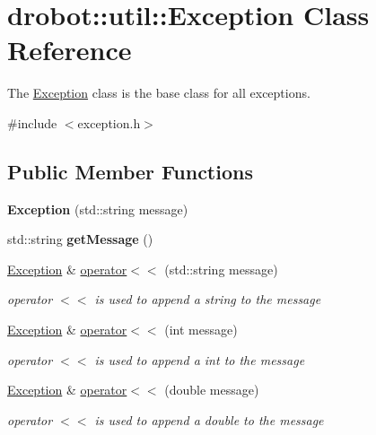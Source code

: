 \hypertarget{classdrobot_1_1util_1_1Exception}{\section{drobot\-:\-:util\-:\-:Exception Class Reference}
\label{classdrobot_1_1util_1_1Exception}
}


The \hyperlink{classdrobot_1_1util_1_1Exception}{Exception} class is the base class for all exceptions.  




{\ttfamily \#include $<$exception.\-h$>$}

\subsection*{Public Member Functions}
\begin{DoxyCompactItemize}
\item 
\hypertarget{classdrobot_1_1util_1_1Exception_a6a910e1c09a10ce2bad7fabec0b08443}{{\bfseries Exception} (std\-::string message)}\label{classdrobot_1_1util_1_1Exception_a6a910e1c09a10ce2bad7fabec0b08443}

\item 
\hypertarget{classdrobot_1_1util_1_1Exception_a335a60268148f7389c21a12fe48bafcf}{std\-::string {\bfseries get\-Message} ()}\label{classdrobot_1_1util_1_1Exception_a335a60268148f7389c21a12fe48bafcf}

\item 
\hyperlink{classdrobot_1_1util_1_1Exception}{Exception} \& \hyperlink{classdrobot_1_1util_1_1Exception_a551cef708ba29da1d9129ec464e99a75}{operator$<$$<$} (std\-::string message)
\begin{DoxyCompactList}\small\item\em operator $<$$<$ is used to append a string to the message \end{DoxyCompactList}\item 
\hyperlink{classdrobot_1_1util_1_1Exception}{Exception} \& \hyperlink{classdrobot_1_1util_1_1Exception_a1e79ba068991f137adc7cdccf1b0f054}{operator$<$$<$} (int message)
\begin{DoxyCompactList}\small\item\em operator $<$$<$ is used to append a int to the message \end{DoxyCompactList}\item 
\hyperlink{classdrobot_1_1util_1_1Exception}{Exception} \& \hyperlink{classdrobot_1_1util_1_1Exception_aa817875aaf71163089f3e13e2e0732e6}{operator$<$$<$} (double message)
\begin{DoxyCompactList}\small\item\em operator $<$$<$ is used to append a double to the message \end{DoxyCompactList}\end{DoxyCompactItemize}
